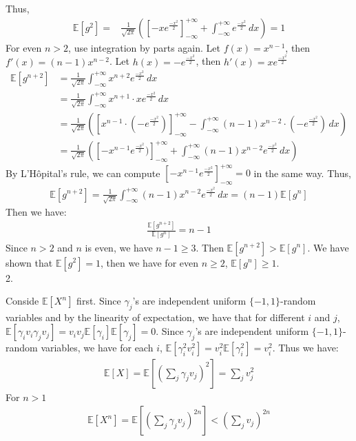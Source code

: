 Thus,
\begin{align}
    \nonumber \mathbb{E}[g^2]=&\frac{1}{\sqrt{2\pi}}(\left[-xe^{\frac{-x^2}{2}}\right]_{-\infty}^{+\infty}+\int_{-\infty }^{+\infty }e^{\frac{-x^2}{2}}\,dx )=1
\end{align}
For even $n > 2$, use integration by parts again.
Let $f(x)=x^{n-1}$, then $f'(x)=(n-1)x^{n-2}$. Let $h(x)=-e^{\frac{-x^2}{2}} $, then $h'(x)= xe^{\frac{-x^2}{2}}$
\begin{align}
    \nonumber \mathbb{E}[g^{n+2}]&=\frac{1}{\sqrt{2\pi}}\int_{-\infty }^{+\infty }x^{n+2}e^{\frac{-x^2}{2}}\,dx\\
    \nonumber &=\frac{1}{\sqrt{2\pi}}\int_{-\infty }^{+\infty }x^{n+1}\cdot x e^{\frac{-x^2}{2}}\,dx\\
    \nonumber &=\frac{1}{\sqrt{2\pi}}\left(\left[x^{n-1}\cdot (-e^{\frac{-x^2}{2}})\right]_{-\infty}^{+\infty}-\int_{-\infty }^{+\infty }(n-1)x^{n-2}\cdot (-e^{\frac{-x^2}{2}})\,dx \right)\\
    \nonumber &=\frac{1}{\sqrt{2\pi}}\left(\left[-x^{n-1}e^{\frac{-x^2}{2}})\right]_{-\infty}^{+\infty}+\int_{-\infty }^{+\infty }(n-1)x^{n-2}e^{\frac{-x^2}{2}}\,dx \right)
\end{align}
By L'Hôpital's rule, we can compute $\left[-x^{n-1}e^{\frac{-x^2}{2}}\right]_{-\infty}^{+\infty}=0$ in the same way.
Thus,
\begin{align}
    \nonumber \mathbb{E}[g^{n+2}]=\frac{1}{\sqrt{2\pi}}\int_{-\infty }^{+\infty }(n-1)x^{n-2}e^{\frac{-x^2}{2}}\,dx 
    =(n-1)\mathbb{E}[g^{n}]
\end{align} 
Then we have:
\begin{align}
    \nonumber \frac{\mathbb{E}[g^{n+2}]}{\mathbb{E}[g^{n}]}=n-1
\end{align}
Since $n>2$ and $n$ is even, we have $n-1\ge 3$.
Then $\mathbb{E}[g^{n+2}]>\mathbb{E}[g^{n}]$.
We have shown that $\mathbb{E}[g^{2}]=1$, then we have for even $n \ge 2$, $\mathbb{E}[g^n]\ge 1$.\\
2.

Conside $\mathbb{E}[X^n]$ first.
Since $\gamma _j$'s are independent uniform $\{-1,1\}$-random variables and by the linearity of expectation,
we have that for different $i$ and $j$, $\mathbb{E}[\gamma _iv_i\gamma _jv_j]=v_iv_j\mathbb{E}[\gamma _i]\mathbb{E}[\gamma _j]=0$.
Since $\gamma _j$'s are independent uniform $\{-1,1\}$-random variables, we have for each $i$, $\mathbb{E}[\gamma _i^2v_i^2]=v_i^2\mathbb{E}[\gamma _i^2]=v_i^2$.
Thus we have:
\begin{align}
    \nonumber \mathbb{E}[X]=\mathbb{E}[(\sum_j\gamma _jv_j)^2] 
    =\sum_j v_j^{2}
\end{align}
For $n>1$
\begin{align}
    \nonumber \mathbb{E}[X^n]=\mathbb{E}[(\sum_j\gamma _jv_j)^{2n}] 
    <(\sum_j v_j)^{2n}
\end{align}

